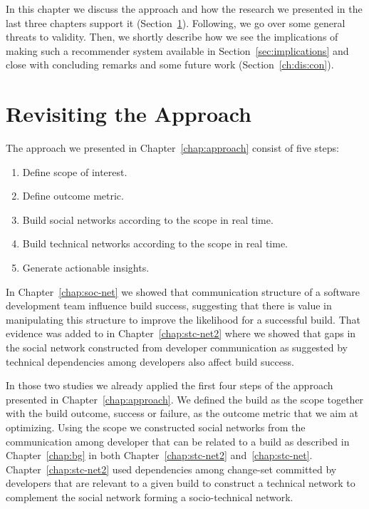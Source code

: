 \label{chap:disc}
In this chapter we discuss the approach and how the research we presented in the last three chapters support it (Section~\ref{ch:dis:app}).
Following, we go over some general threats to validity.
Then, we shortly describe how we see the implications of making such a recommender system available in Section~\ref{sec:implications} and close with concluding remarks and some future work (Section~\ref{ch:dis:con}).

\section{Revisiting the Approach}
\label{ch:dis:app}
The approach we presented in Chapter~\ref{chap:approach} consist of five steps:

\begin{enumerate}
\item Define scope of interest.
\item Define outcome metric.
\item Build social networks according to the scope in real time.
\item Build technical networks according to the scope in real time.
\item Generate actionable insights.
\end{enumerate}

In Chapter~\ref{chap:soc-net} we showed that communication structure of a software development team influence build success, suggesting that there is value in manipulating this structure to improve the likelihood for a successful build.
That evidence was added to in Chapter~\ref{chap:stc-net2} where we showed that gaps in the social network constructed from developer communication as suggested by technical dependencies among developers also affect build success.

In those two studies we already applied the first four steps of the approach presented in Chapter~\ref{chap:approach}.
We defined the build as the scope together with the build outcome, success or failure, as the outcome metric that we aim at optimizing.
Using the scope we constructed social networks from the communication among developer that can be related to a build as described in Chapter~\ref{chap:bg} in both Chapter~\ref{chap:stc-net2} and~\ref{chap:stc-net}.
Chapter~\ref{chap:stc-net2} used dependencies among change-set committed by developers that are relevant to a given build to construct a technical network to complement the social network forming a socio-technical network.

